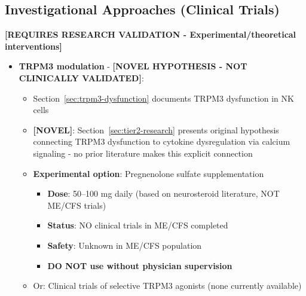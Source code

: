\subsection{Investigational Approaches (Clinical Trials)}

\textbf{[REQUIRES RESEARCH VALIDATION - Experimental/theoretical interventions]}

\begin{itemize}
    \item \textbf{TRPM3 modulation} - \textbf{[NOVEL HYPOTHESIS - NOT CLINICALLY VALIDATED]}:
    \begin{itemize}
        \item Section~\ref{sec:trpm3-dysfunction} documents TRPM3 dysfunction in NK cells
        \item \textbf{[NOVEL]}: Section~\ref{sec:tier2-research} presents original hypothesis connecting TRPM3 dysfunction to cytokine dysregulation via calcium signaling - no prior literature makes this explicit connection
        \item \textbf{Experimental option}: Pregnenolone sulfate supplementation
        \begin{itemize}
            \item \textbf{Dose}: 50--100 mg daily (based on neurosteroid literature, NOT ME/CFS trials)
            \item \textbf{Status}: NO clinical trials in ME/CFS completed
            \item \textbf{Safety}: Unknown in ME/CFS population
            \item \textbf{DO NOT use without physician supervision}
        \end{itemize}
        \item Or: Clinical trials of selective TRPM3 agonists (none currently available)
    \end{itemize}


\end{itemize}
